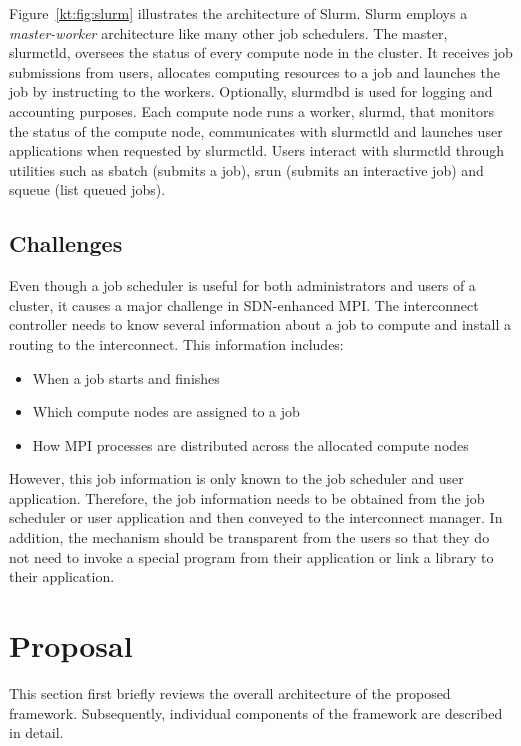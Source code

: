 \documentclass[graybox]{svmult}
\begin{document}
Figure~\ref{kt:fig:slurm} illustrates the architecture of Slurm. Slurm employs
a \textit{master-worker} architecture like many other job schedulers. The
master, slurmctld, oversees the status of every compute node in the cluster.
It receives job submissions from users, allocates computing resources to a job
and launches the job by instructing to the workers. Optionally, slurmdbd is
used for logging and accounting purposes. Each compute node runs a worker,
slurmd, that monitors the status of the compute node, communicates with
slurmctld and launches user applications when requested by slurmctld. Users
interact with slurmctld through utilities such as sbatch (submits a job), srun
(submits an interactive job) and squeue (list queued jobs).

\subsection{Challenges}

Even though a job scheduler is useful for both administrators and users of a
cluster, it causes a major challenge in SDN-enhanced MPI\@. The interconnect
controller needs to know several information about a job to compute and
install a routing to the interconnect. This information includes:

\begin{itemize}
    \item When a job starts and finishes
    \item Which compute nodes are assigned to a job
    \item How MPI processes are distributed across the allocated compute nodes
\end{itemize}

However, this job information is only known to the job scheduler and user
application. Therefore, the job information needs to be obtained from the job
scheduler or user application and then conveyed to the interconnect manager.
In addition, the mechanism should be transparent from the users so that they
do not need to invoke a special program from their application or link a
library to their application.

\section{Proposal}\label{kt:sec:iii}

This section first briefly reviews the overall architecture of the proposed
framework. Subsequently, individual components of the framework are described
in detail.
\end{document}
